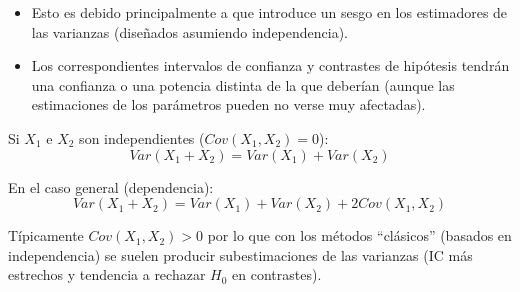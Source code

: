 \documentclass[
  spanish,
  10pt,
]{book}
\theoremstyle{break}
\theoremstyle{nonumberplain}
\begin{document}
\begin{itemize}
\item
  Esto es debido principalmente a que introduce un sesgo en los
  estimadores de las varianzas (diseñados asumiendo independencia).
\item
  Los correspondientes intervalos de confianza y
  contrastes de hipótesis tendrán una confianza o una potencia
  distinta de la que deberían (aunque las estimaciones de los parámetros
  pueden no verse muy afectadas).
\end{itemize}

Si \(X_{1}\) e \(X_{2}\) son independientes (\(Cov(X_{1},X_{2})=0\)):
\[Var(X_{1}+X_{2})=Var(X_{1})+Var(X_{2})\]

En el caso general (dependencia):
\[Var(X_{1}+X_{2})=Var(X_{1})+Var(X_{2})+2Cov(X_{1},X_{2})\]

Típicamente \(Cov(X_{1},X_{2})>0\) por lo que con los métodos ``clásicos'' (basados en independencia) se suelen producir subestimaciones de las varianzas (IC más estrechos y tendencia a rechazar \(H_0\) en contrastes).
\end{document}
